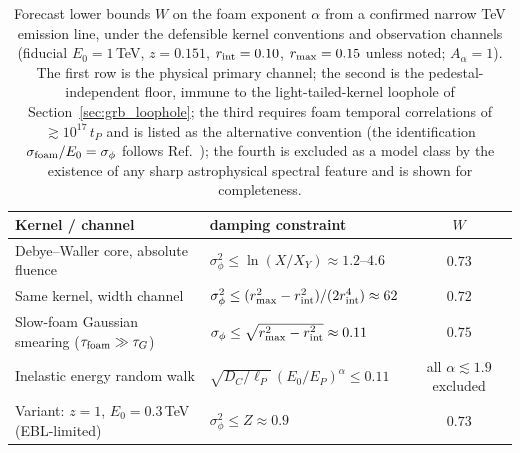 \documentclass[aps,prd,onecolumn,amsmath,amssymb]{revtex4-2}
\begin{document}
\begin{table}[h]
\caption{Forecast lower bounds $W$ on the foam exponent $\alpha$ from
a confirmed narrow TeV emission line, under the defensible kernel
conventions and observation channels (fiducial $E_0=1$\,TeV,
$z=0.151$, $r_{\rm int}=0.10$, $r_{\rm max}=0.15$ unless noted;
$A_\alpha=1$).  The first row is the physical primary channel; the
second is the pedestal-independent floor, immune to the
light-tailed-kernel loophole of Section~\ref{sec:grb_loophole}; the
third requires foam temporal correlations of $\gtrsim10^{17}\,t_P$
and is listed as the alternative convention (the identification
$\sigma_{\rm foam}/E_0=\sigma_\phi$ follows
Ref.~\cite{LieuHillman2003}); the fourth is excluded as a model class
by the existence of any sharp astrophysical spectral feature and is
shown for completeness.}
\label{tab:tevline}
\begin{ruledtabular}
\begin{tabular}{llc}
Kernel / channel & damping constraint & $W$ \\
\hline
Debye--Waller core, absolute fluence &
  $\sigma_\phi^2\le\ln(X/X_Y)\approx1.2$--$4.6$ & $0.73$ \\
Same kernel, width channel &
  $\sigma_\phi^2\le(r_{\rm max}^2-r_{\rm int}^2)/(2r_{\rm int}^4)\approx62$ & $0.72$ \\
Slow-foam Gaussian smearing ($\tau_{\rm foam}\gg\tau_G$) &
  $\sigma_\phi\le\sqrt{r_{\rm max}^2-r_{\rm int}^2}\approx0.11$ & $0.75$ \\
Inelastic energy random walk &
  $\sqrt{D_C/\ell_P}\,(E_0/E_P)^\alpha\le0.11$ & all $\alpha\lesssim1.9$ excluded \\
Variant: $z=1$, $E_0=0.3$\,TeV (EBL-limited) &
  $\sigma_\phi^2\le Z\approx0.9$ & $0.73$ \\
\end{tabular}
\end{ruledtabular}
\end{table}
\end{document}
